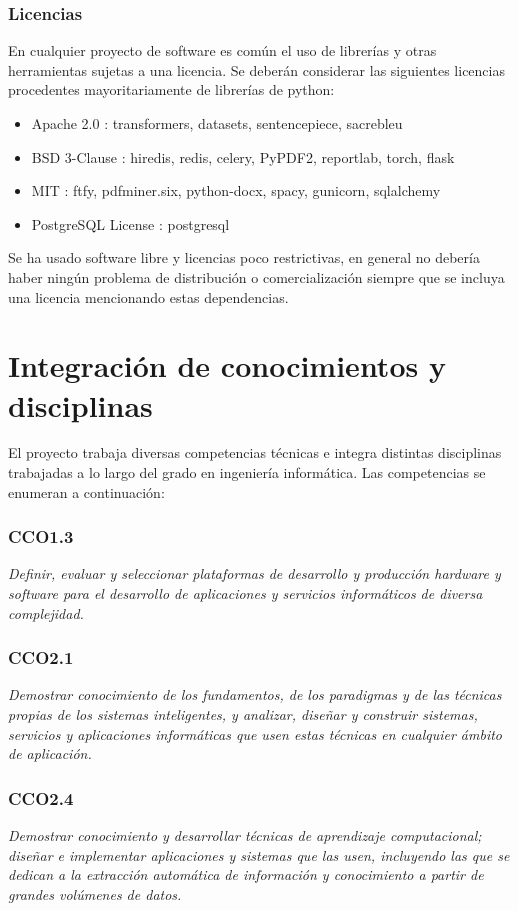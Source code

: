 \subsubsection{Licencias}
En cualquier proyecto de software es común el uso de librerías y otras herramientas sujetas a una licencia. Se deberán considerar las siguientes licencias procedentes mayoritariamente de librerías de python:
\begin{itemize}
    \item Apache 2.0 \cite{Apache2license}: transformers, datasets, sentencepiece, sacrebleu
    \item BSD 3-Clause \cite{BSD3Clause}: hiredis, redis, celery, PyPDF2, reportlab, torch, flask
    \item MIT \cite{MITLicense}: ftfy, pdfminer.six, python-docx, spacy, gunicorn, sqlalchemy
    \item PostgreSQL License \cite{Postgreslicense}: postgresql
\end{itemize}
Se ha usado software libre y licencias poco restrictivas, en general no debería haber ningún problema de distribución o comercialización siempre que se incluya una licencia mencionando estas dependencias.

\section{Integración de conocimientos y disciplinas}
El proyecto trabaja diversas competencias técnicas e integra distintas disciplinas trabajadas a lo largo del grado en ingeniería informática. Las competencias se enumeran a continuación:

\subsubsection{CCO1.3}\textit{Definir, evaluar y seleccionar plataformas de desarrollo y producción hardware y software para el desarrollo de aplicaciones y servicios informáticos de diversa complejidad.}%
\subsubsection{CCO2.1}\textit{Demostrar conocimiento de los fundamentos, de los paradigmas y de las técnicas propias de los sistemas inteligentes, y analizar, diseñar y construir sistemas, servicios y aplicaciones informáticas que usen estas técnicas en cualquier ámbito de aplicación.}%
\subsubsection{CCO2.4}\textit{Demostrar conocimiento y desarrollar técnicas de aprendizaje computacional; diseñar e implementar aplicaciones y sistemas que las usen, incluyendo las que se dedican a la extracción automática de información y conocimiento a partir de grandes volúmenes de datos.}%

